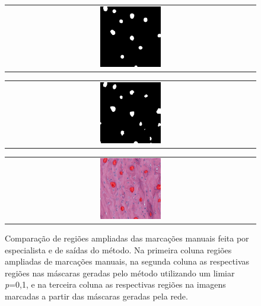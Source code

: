 \begin{figure}[H]
    \begin{tabular}{@{}c@{}}
        \includegraphics[width=0.25\textwidth]{figures/4_results/204_r4c2_mask_manual_10.png}
        \\[\abovecaptionskip]
    \end{tabular}
    \begin{tabular}{@{}c@{}}
        \includegraphics[width=0.25\textwidth]{figures/4_results/204_r4c2_mask_net_10.png}
        \\[\abovecaptionskip]
    \end{tabular}
    \begin{tabular}{@{}c@{}}
        \includegraphics[width=0.25\textwidth]{figures/4_results/204_r4c2_net_out_10.png}
        \\[\abovecaptionskip]
    \end{tabular}
  
    \caption[Comparação de regiões ampliadas das marcações manuais feita por especialista e de saídas do método]{Comparação de regiões ampliadas das marcações manuais feita por especialista e de saídas do método. Na primeira coluna regiões ampliadas de marcações manuais, na segunda coluna as respectivas regiões nas máscaras geradas pelo método utilizando um limiar \textit{p}=0,1, e na terceira coluna as respectivas regiões na imagens marcadas a partir das máscaras geradas pela rede.}
    \label{fig:marcacoes-final-canal-regioes}
\end{figure}

